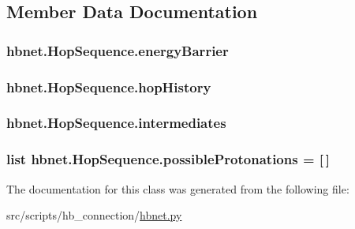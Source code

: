 \subsection{Member Data Documentation}
\hypertarget{classhbnet_1_1_hop_sequence_a1c05eea4fe546f604fa4709ea707f07f}{
\subsubsection[{energy\-Barrier}]{\setlength{\rightskip}{0pt plus 5cm}hbnet.\-Hop\-Sequence.\-energy\-Barrier}}\label{classhbnet_1_1_hop_sequence_a1c05eea4fe546f604fa4709ea707f07f}
\hypertarget{classhbnet_1_1_hop_sequence_a66dd2f48420f66b8d167b4ee84d41481}{
\subsubsection[{hop\-History}]{\setlength{\rightskip}{0pt plus 5cm}hbnet.\-Hop\-Sequence.\-hop\-History}}\label{classhbnet_1_1_hop_sequence_a66dd2f48420f66b8d167b4ee84d41481}
\hypertarget{classhbnet_1_1_hop_sequence_af4dceddc7a9cf838faef6e7ea4539e58}{
\subsubsection[{intermediates}]{\setlength{\rightskip}{0pt plus 5cm}hbnet.\-Hop\-Sequence.\-intermediates}}\label{classhbnet_1_1_hop_sequence_af4dceddc7a9cf838faef6e7ea4539e58}
\hypertarget{classhbnet_1_1_hop_sequence_a3b83a5768107cf8e552c7f969a27374f}{
\subsubsection[{possible\-Protonations}]{\setlength{\rightskip}{0pt plus 5cm}list hbnet.\-Hop\-Sequence.\-possible\-Protonations = \mbox{[}$\,$\mbox{]}\hspace{0.3cm}{\ttfamily [static]}}}\label{classhbnet_1_1_hop_sequence_a3b83a5768107cf8e552c7f969a27374f}


The documentation for this class was generated from the following file\-:\begin{DoxyCompactItemize}
\item 
src/scripts/hb\-\_\-connection/\hyperlink{hbnet_8py}{hbnet.\-py}\end{DoxyCompactItemize}
